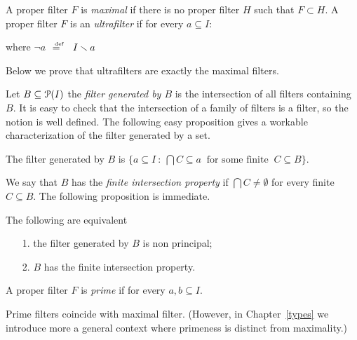 \documentclass[creche.tex]{subfiles}
\begin{document}
A proper filter $F$ is \emph{maximal\/} if there is no proper filter $H$ such that $F\subset H$. A proper filter $F$ is an \emph{ultrafilter\/} if for every $a\subseteq I$:

\hfill where \emph{$\neg a$}$\ \ \deq\ \ I\sm a$

Below we prove that ultrafilters are exactly the maximal filters.

Let $B\subseteq\P(I)$ the \emph{filter generated by $B$\/} is the intersection of all filters containing $B$. It is easy to check that the intersection of a family of filters is a filter, so the notion is well defined. The following easy proposition gives a workable characterization of the filter generated by a set.

\begin{proposition} The filter generated by $B$ is $\big\{a\subseteq I\ :\ \bigcap C\subseteq a\ \textrm{ for some finite }\ C\subseteq B\big\}$.\QED

\end{proposition}

We say that $B$ has the \emph{finite intersection property\/} if $\bigcap C\neq\emptyset$ for every finite $C\subseteq B$. The following proposition is immediate.

\begin{proposition} The following are equivalent
\begin{itemize}
\item[1.] the filter generated by $B$ is non principal;
\item[2.] $B$ has the finite intersection property.\QED
\end{itemize}
\end{proposition}




A proper filter $F$ is \emph{prime\/} if for every $a,b\subseteq I$.


Prime filters coincide with maximal filter. (However, in Chapter~\ref{types} we introduce more a general context where primeness is distinct from maximality.)
\end{document}
